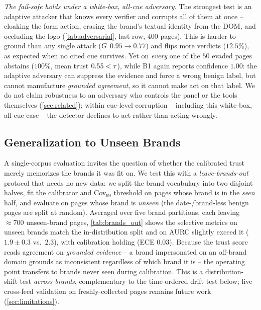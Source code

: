 \emph{The fail-safe holds under a white-box, all-cue adversary.} The strongest test is an
adaptive attacker that knows every verifier and corrupts all of them at once -- cloaking the
form action, erasing the brand's textual identity from the DOM, and occluding the logo
(\autoref{tab:adversarial}, last row, $400$ pages). This is harder to ground than any single
attack ($G$ $0.95\to0.77$) and flips more verdicts ($12.5\%$), as expected when no cited cue
survives. Yet on \emph{every} one of the $50$ evaded pages \toolname{} abstains
($100\%$, mean trust $0.55<\tau$), while B1 again reports confidence $1.00$: the adaptive
adversary can suppress the evidence and force a wrong \textsf{benign} label, but cannot
manufacture \emph{grounded agreement}, so it cannot make \toolname{} act on that label. We do
not claim robustness to an adversary who controls the panel or the tools themselves
(\autoref{sec:related}); within cue-level corruption -- including this white-box, all-cue case
-- the detector declines to act rather than acting wrongly.


\subsection{Generalization to Unseen Brands}
\label{sec:exp_brands}
A single-corpus evaluation invites the question of whether the calibrated trust merely
memorizes the brands it was fit on. We test this with a \emph{leave-brands-out} protocol that
needs no new data: we split the brand vocabulary into two disjoint halves, fit the calibrator
and Cov$_{99}$ threshold on pages whose brand is in the \emph{seen} half, and evaluate on pages
whose brand is \emph{unseen} (the date-/brand-less benign pages are split at random). Averaged
over five brand partitions, each leaving $\approx700$ unseen-brand pages,
\autoref{tab:brands_out} shows the selective metrics on unseen brands match the
in-distribution split and on AURC slightly exceed it ($1.9\pm0.3$ vs.\ $2.3$), with calibration
holding (ECE $0.03$). Because the trust score reads agreement on \emph{grounded evidence} --
a brand impersonated on an off-brand domain grounds as inconsistent regardless of which brand
it is -- the operating point transfers to brands never seen during calibration. This is a
distribution-shift test \emph{across brands}, complementary to the time-ordered drift test
below; live cross-feed validation on freshly-collected pages remains future work
(\autoref{sec:limitations}).



